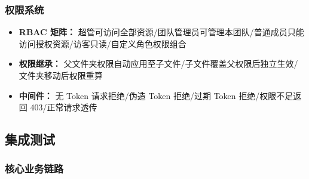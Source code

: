 \documentclass[a4paper,zihao=-4]{ctexart}
\begin{document}
\subsubsection{权限系统}

\begin{itemize}
  \item \textbf{RBAC 矩阵：} 超管可访问全部资源/团队管理员可管理本团队/普通成员只能访问授权资源/访客只读/自定义角色权限组合
  \item \textbf{权限继承：} 父文件夹权限自动应用至子文件/子文件覆盖父权限后独立生效/文件夹移动后权限重算
  \item \textbf{中间件：} 无 Token 请求拒绝/伪造 Token 拒绝/过期 Token 拒绝/权限不足返回
        403/正常请求透传
\end{itemize}

\subsection{集成测试}

\subsubsection{核心业务链路}
\end{document}
